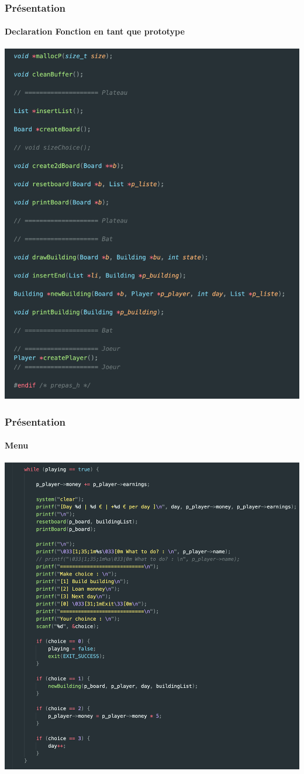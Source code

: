 \documentclass{beamer}
\begin{document}
\begin{frame} %
\frametitle{Présentation}
\framesubtitle{Declaration Fonction en tant que prototype}

\begin{center}
    \includegraphics[scale=0.25]{src/images/declaration_fonction_as_prototype.png}
\end{center}

\end{frame}

\begin{frame} %
    \frametitle{Présentation}
    \framesubtitle{Menu}
    
    \begin{center}
        \includegraphics[scale=0.24]{src/images/menu.png}
    \end{center}
    
    \end{frame}
\end{document}
